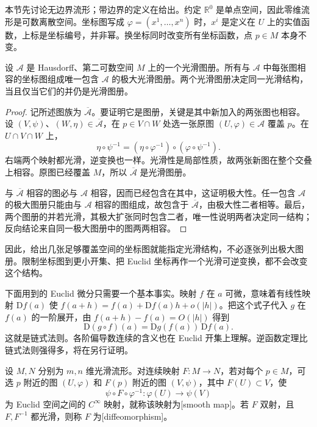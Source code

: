 本节先讨论无边界流形；带边界的定义在给出。约定 \(\mathbb R^0\) 是单点空间，因此零维流形是可数离散空间。坐标图写成 \(\varphi=(x^1,\ldots,x^n)\) 时，\(x^i\) 是定义在 \(U\) 上的实值函数，上标是坐标编号，并非幂。换坐标同时改变所有坐标函数，点 \(p\in M\) 本身不变。

\begin{proposition}
	\label{g1:prop:atlas-maximal-extension}
	设 \(\mathcal A\) 是 Hausdorff、第二可数空间 \(M\) 上的一个光滑图册。所有与 \(\mathcal A\) 中每张图相容的坐标图组成唯一包含 \(\mathcal A\) 的极大光滑图册。两个光滑图册决定同一光滑结构，当且仅当它们的并仍是光滑图册。
\end{proposition}

\begin{proof}
	记所述图族为 \(\overline{\mathcal A}\)。要证明它是图册，关键是其中新加入的两张图也相容。设 \((V,\psi)\)、\((W,\eta)\in\overline{\mathcal A}\)，在 \(p\in V\cap W\) 处选一张原图 \((U,\varphi)\in\mathcal A\) 覆盖 \(p\)。在 \(U\cap V\cap W\) 上，
	\[
		\eta\circ\psi^{-1}=(\eta\circ\varphi^{-1})\circ(\varphi\circ\psi^{-1}).
	\]
	右端两个映射都光滑，逆变换也一样。光滑性是局部性质，故两张新图在整个交叠上相容。原图已经覆盖 \(M\)，所以 \(\overline{\mathcal A}\) 是光滑图册。

	与 \(\overline{\mathcal A}\) 相容的图必与 \(\mathcal A\) 相容，因而已经包含在其中，这证明极大性。任一包含 \(\mathcal A\) 的极大图册只能由与 \(\mathcal A\) 相容的图组成，故包含于 \(\overline{\mathcal A}\)，由极大性二者相等。最后，两个图册的并若光滑，其极大扩张同时包含二者，唯一性说明两者决定同一结构；反向结论来自同一极大图册中的图两两相容。
\end{proof}

因此，给出几张足够覆盖空间的坐标图就能指定光滑结构，不必逐张列出极大图册。限制坐标图到更小开集、把 Euclid 坐标再作一个光滑可逆变换，都不会改变这个结构。

\ProseParagraphBreak

下面用到的 Euclid 微分只需要一个基本事实。映射 \(f\) 在 \(a\) 可微，意味着有线性映射 \(\mathrm{D}f(a)\) 使 \(f(a+h)=f(a)+\mathrm{D}f(a)h+o(|h|)\)。把这个式子代入 \(g\) 在 \(f(a)\) 的一阶展开，由 \(f(a+h)-f(a)=O(|h|)\) 得到
\[
	\mathrm{D}(g\circ f)(a)=\mathrm{D}g(f(a))\,\mathrm{D}f(a).
\]
这就是链式法则。各阶偏导数连续的含义也在 Euclid 开集上理解。逆函数定理比链式法则强得多，将在另行证明。

\begin{definition}
	\label{g1:def:smooth-map}
	设 \(M,N\) 分别为 \(m,n\) 维光滑流形。对连续映射 \(F:M\to N\)，若对每个 \(p\in M\)，可选 \(p\) 附近的图 \((U,\varphi)\) 和 \(F(p)\) 附近的图 \((V,\psi)\)，其中 \(F(U)\subset V\)，使
	\[
		\psi\circ F\circ\varphi^{-1}:\varphi(U)\longrightarrow\psi(V)
	\]
	为 Euclid 空间之间的 \(C^\infty\) 映射，就称该映射为[smooth map]。若 \(F\) 双射，且 \(F,F^{-1}\) 都光滑，则称 \(F\) 为[diffeomorphism]。
\end{definition}


